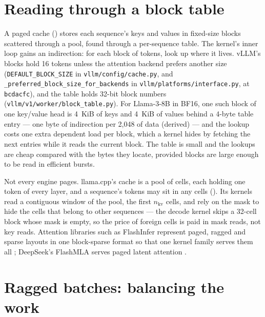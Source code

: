 \section{Reading through a block table}

A paged cache () stores each sequence's keys and values in
fixed-size blocks scattered through a pool, found through a per-sequence table.
The kernel's inner loop gains an indirection: for each block of tokens, look up
where it lives. vLLM's blocks hold 16 tokens unless the attention backend
prefers another size (\texttt{DEFAULT\_BLOCK\_SIZE} in
\texttt{vllm/config/cache.py}, and \texttt{\_preferred\_block\_size\_for\_backends}
in \texttt{vllm/platforms/interface.py}, at \texttt{bcdacfc}), and the table holds
32-bit block numbers (\texttt{vllm/v1/worker/block\_table.py}). For Llama-3-8B in
BF16, one such block of one key/value head is 4~KiB of keys and 4~KiB of values
behind a 4-byte table entry --- one byte of indirection per 2,048 of data
(derived) --- and the lookup costs one extra dependent load per block, which a
kernel hides by fetching the next entries while it reads the current block.
The table is small and the lookups are cheap compared with the bytes they
locate, provided blocks are large enough to be read in efficient bursts.

Not every engine pages. llama.cpp's cache is a pool of cells, each holding one
token of every layer, and a sequence's tokens may sit in any cells
(). Its kernels read a contiguous window of the pool, the first
$n_\text{kv}$ cells, and rely on the mask to hide the cells that belong to other
sequences --- the decode kernel skips a 32-cell block whose mask is empty, so
the price of foreign cells is paid in mask reads, not key reads. Attention
libraries such as FlashInfer represent paged, ragged and sparse layouts in one
block-sparse format so that one kernel family serves them all
\cite{ye2025flashinfer}; DeepSeek's FlashMLA serves paged latent attention
\cite{deepseek2025flashmla}.

\section{Ragged batches: balancing the work}

